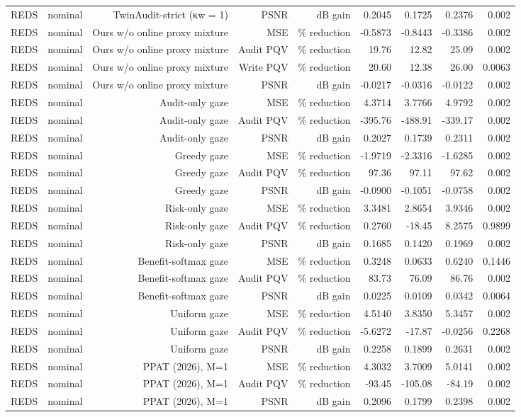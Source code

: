 \begin{table}[t]
\begin{tabular}{llrrrrrrr}
REDS & nominal & TwinAudit-strict (κw = 1) & PSNR & dB gain & 0.2045 & 0.1725 & 0.2376 & 0.002 \\
REDS & nominal & Ours w/o online proxy mixture & MSE & \% reduction & -0.5873 & -0.8443 & -0.3386 & 0.002 \\
REDS & nominal & Ours w/o online proxy mixture & Audit PQV & \% reduction & 19.76 & 12.82 & 25.09 & 0.002 \\
REDS & nominal & Ours w/o online proxy mixture & Write PQV & \% reduction & 20.60 & 12.38 & 26.00 & 0.0063 \\
REDS & nominal & Ours w/o online proxy mixture & PSNR & dB gain & -0.0217 & -0.0316 & -0.0122 & 0.002 \\
REDS & nominal & Audit-only gaze & MSE & \% reduction & 4.3714 & 3.7766 & 4.9792 & 0.002 \\
REDS & nominal & Audit-only gaze & Audit PQV & \% reduction & -395.76 & -488.91 & -339.17 & 0.002 \\
REDS & nominal & Audit-only gaze & PSNR & dB gain & 0.2027 & 0.1739 & 0.2311 & 0.002 \\
REDS & nominal & Greedy gaze & MSE & \% reduction & -1.9719 & -2.3316 & -1.6285 & 0.002 \\
REDS & nominal & Greedy gaze & Audit PQV & \% reduction & 97.36 & 97.11 & 97.62 & 0.002 \\
REDS & nominal & Greedy gaze & PSNR & dB gain & -0.0900 & -0.1051 & -0.0758 & 0.002 \\
REDS & nominal & Risk-only gaze & MSE & \% reduction & 3.3481 & 2.8654 & 3.9346 & 0.002 \\
REDS & nominal & Risk-only gaze & Audit PQV & \% reduction & 0.2760 & -18.45 & 8.2575 & 0.9899 \\
REDS & nominal & Risk-only gaze & PSNR & dB gain & 0.1685 & 0.1420 & 0.1969 & 0.002 \\
REDS & nominal & Benefit-softmax gaze & MSE & \% reduction & 0.3248 & 0.0633 & 0.6240 & 0.1446 \\
REDS & nominal & Benefit-softmax gaze & Audit PQV & \% reduction & 83.73 & 76.09 & 86.76 & 0.002 \\
REDS & nominal & Benefit-softmax gaze & PSNR & dB gain & 0.0225 & 0.0109 & 0.0342 & 0.0064 \\
REDS & nominal & Uniform gaze & MSE & \% reduction & 4.5140 & 3.8350 & 5.3457 & 0.002 \\
REDS & nominal & Uniform gaze & Audit PQV & \% reduction & -5.6272 & -17.87 & -0.0256 & 0.2268 \\
REDS & nominal & Uniform gaze & PSNR & dB gain & 0.2258 & 0.1899 & 0.2631 & 0.002 \\
REDS & nominal & PPAT (2026), M=1 & MSE & \% reduction & 4.3032 & 3.7009 & 5.0141 & 0.002 \\
REDS & nominal & PPAT (2026), M=1 & Audit PQV & \% reduction & -93.45 & -105.08 & -84.19 & 0.002 \\
REDS & nominal & PPAT (2026), M=1 & PSNR & dB gain & 0.2096 & 0.1799 & 0.2398 & 0.002 \\
\bottomrule
\end{tabular}
\end{table}

